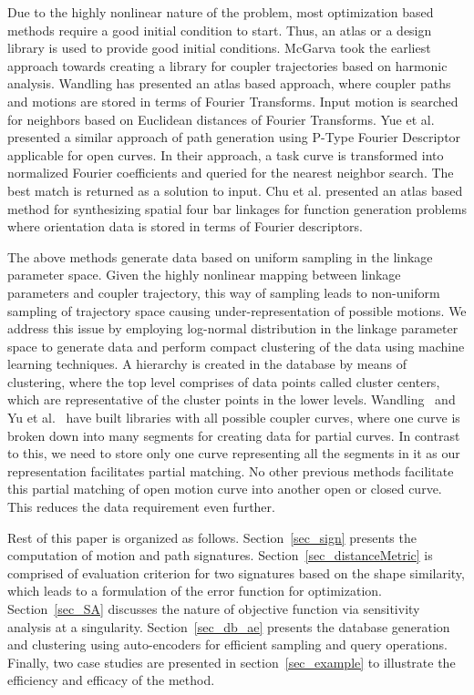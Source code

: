 \documentclass[twocolumn,10pt]{asme2ej}
\begin{document}
Due to the highly nonlinear nature of the problem, most optimization based methods require a good initial condition to start. Thus, an atlas or a design library is used to provide good initial conditions.
McGarva\cite{mcgarva1994} took the earliest approach towards creating a library for coupler trajectories based on harmonic analysis.
Wandling\cite{wandling2000} has presented an atlas based approach, where coupler paths and motions are stored in terms of Fourier Transforms.
Input motion is searched for neighbors based on Euclidean distances of Fourier Transforms.
Yue et al.\cite{yue-pathgen2011} presented a similar approach of path generation using P-Type Fourier Descriptor applicable for open curves.
In their approach, a task curve is transformed into normalized Fourier coefficients and queried for the nearest neighbor search.
The best match is returned as a solution to input. Chu et al.\cite{chu2010} presented an atlas based method for synthesizing spatial four bar linkages for function generation problems where orientation data is stored in terms of Fourier descriptors.

The above methods generate data based on uniform sampling in the linkage parameter space.
Given the highly nonlinear mapping between linkage parameters and coupler trajectory, this way of sampling leads to non-uniform sampling of trajectory space causing under-representation of possible motions.
We address this issue by employing log-normal distribution in the linkage parameter space to generate data and perform compact clustering of the data using machine learning techniques.
A hierarchy is created in the database by means of clustering, where the top level comprises of data points called cluster centers, which are representative of the cluster points in the lower levels.
Wandling~\cite{wandling2000} and Yu et al.~\cite{yue-pathgen2011} have built libraries with all possible coupler curves, where one curve is broken down into many segments for creating data for partial curves.
In contrast to this, we need to store only one curve representing all the segments in it as our representation facilitates partial matching.
No other previous methods facilitate this partial matching of open motion curve into another open or closed curve. This reduces the data requirement even further.

Rest of this paper is organized as follows. Section~\ref{sec_sign} presents the computation of motion and path signatures.
Section~\ref{sec_distanceMetric} is comprised of evaluation criterion for two signatures based on the shape similarity, which leads to a formulation of the error function for optimization.
Section~\ref{sec_SA} discusses the nature of objective function via sensitivity analysis at a singularity.
Section~\ref{sec_db_ae} presents the database generation and clustering using auto-encoders for efficient sampling and query operations.
Finally, two case studies are presented in section~\ref{sec_example} to illustrate the efficiency and efficacy of the method.
\end{document}
